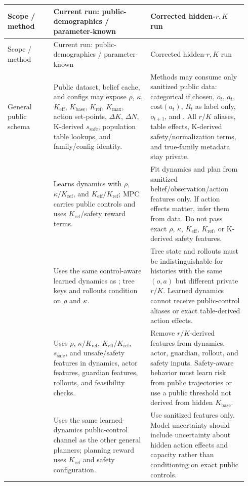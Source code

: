 \documentclass[11pt]{article}
\newcommand{\code}[1]{\texttt{\detokenize{#1}}}
\newcommand{\Kbase}{K_{\mathrm{base}}}
\newcommand{\Keff}{K_{\mathrm{eff}}}
\newcommand{\Kref}{K_{\mathrm{ref}}}
\newcommand{\Kmax}{K_{\max}}
\newcommand{\ssafe}{s_{\mathrm{safe}}}
\begin{document}
\begin{longtable}{p{0.18\linewidth}p{0.38\linewidth}p{0.38\linewidth}}
\toprule
Scope / method & Current run: public-demographics / parameter-known & Corrected hidden-\(r,K\) run \\
\midrule
\endfirsthead
\toprule
Scope / method & Current run: public-demographics / parameter-known & Corrected hidden-\(r,K\) run \\
\midrule
\endhead
General public schema &
Public dataset, belief cache, and configs may expose \(\rho\), \(\kappa\),
\(\Keff\), \(\Kbase\), \(\Kref\), \(\Kmax\), action set-points, \(\Delta K\),
\(\Delta N\), K-derived \(\ssafe\), population table lookups, and family/config
identity. &
Methods may consume only sanitized public data: categorical \code{pop_id} if
chosen, \(o_t\), \(a_t\), \(\mathrm{cost}(a_t)\), \(R_t\) as label only,
\(o_{t+1}\), and \code{done}. All \(r/K\) aliases, table effects, K-derived
safety/normalization terms, and true-family metadata stay private. \\

\code{refplan} &
Learns dynamics with \(\rho\), \(\kappa/\Kref\), and \(\Keff/\Kref\); MPC
carries public controls and uses \(\Kref\)/safety reward terms. &
Fit dynamics and plan from sanitized belief/observation/action features only.
If action effects matter, infer them from data. Do not pass exact \(\rho\),
\(\kappa\), \(\Keff\), \(\Kref\), or K-derived safety features. \\

\code{bamcts} &
Uses the same control-aware learned dynamics as \code{refplan}; tree keys and
rollouts condition on \(\rho\) and \(\kappa\). &
Tree state and rollouts must be indistinguishable for histories with the same
\((o,a)\) but different private \(r/K\). Learned dynamics cannot receive
public-control aliases or exact table-derived action effects. \\

\code{ogsrl} &
Uses \(\rho\), \(\kappa/\Kref\), \(\Keff/\Kref\), \(\ssafe\), and unsafe/safety
features in dynamics, actor features, guardian features, rollouts, and
feasibility checks. &
Remove \(r/K\)-derived features from dynamics, actor, guardian, rollout, and
safety inputs. Safety-aware behavior must learn risk from public trajectories or
use a public threshold not derived from hidden \(\Kbase\). \\

\code{mopo} &
Uses the same learned-dynamics public-control channel as the other general
planners; planning reward uses \(\Kref\) and safety configuration. &
Use sanitized features only. Model uncertainty should include uncertainty about
hidden action effects and capacity rather than conditioning on exact public
controls. \\


\end{longtable}
\end{document}
